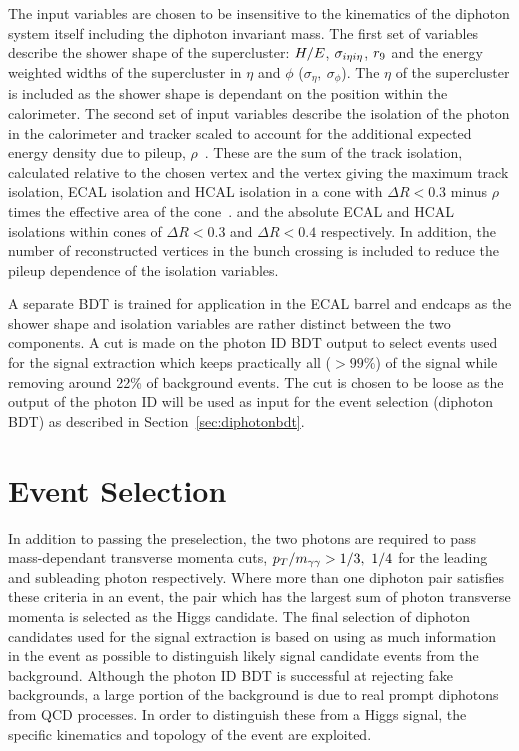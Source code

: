 The input variables are chosen to be insensitive to the kinematics of the diphoton system itself
including the diphoton invariant mass. The first set of variables describe the shower shape of the 
supercluster: $H/E$, $\sigma_{i\eta i\eta}$, $r_{9}$ and the energy weighted widths of the supercluster in
$\eta$ and $\phi$ ($\sigma_{\eta},~\sigma_{\phi}$). The $\eta$ of the supercluster is 
included as the shower shape is dependant on the position within the calorimeter. 
The second set of input variables describe the
isolation of the photon in the calorimeter and tracker scaled to account for 
the additional expected energy density due to pileup, $\rho$~\citep{2011JInst611002C}. 
These are the sum of the track isolation, 
calculated relative to the chosen vertex and the vertex giving the maximum track isolation,
ECAL isolation and HCAL isolation in a cone with $\Delta R<0.3$ minus $\rho$ times the effective area 
of the cone~\citep{2011JInst611002C}.
and the absolute ECAL and HCAL isolations within cones of $\Delta R <0.3$ and $\Delta R<0.4$ 
respectively. In addition, the number of reconstructed vertices in the bunch crossing is included
to reduce the pileup dependence of the isolation variables. 

A separate BDT is trained for application in the ECAL barrel and endcaps as the shower
shape and isolation variables are rather distinct between the two components. 
A cut is made on the photon ID BDT output to select events used for the signal extraction which
keeps practically all ($>99\%$) of the signal while removing around 22\% of background events.
The cut is chosen to be loose as the output of the photon ID will be used as input for the 
event selection (diphoton BDT) as described in Section~\ref{sec:diphotonbdt}. 

\section{Event Selection}
\label{sec:eventselection}

In addition to passing the preselection, the two photons are required to pass mass-dependant transverse 
momenta cuts, $p_{T}/m_{\gamma\gamma} > 1/3, ~1/4$ for the leading and subleading photon respectively.
Where more than one diphoton pair satisfies these criteria in an event, the pair which has the largest
sum of photon transverse momenta is selected as the Higgs candidate.
The final selection of diphoton candidates used for the signal extraction is based on using as much information 
in the event as possible to distinguish likely signal candidate events from the background. Although the 
photon ID BDT is successful at rejecting fake backgrounds, a large portion of the background is due to
real prompt diphotons from QCD processes. In order to distinguish these from a Higgs signal, 
the specific kinematics and topology of the event are exploited.

